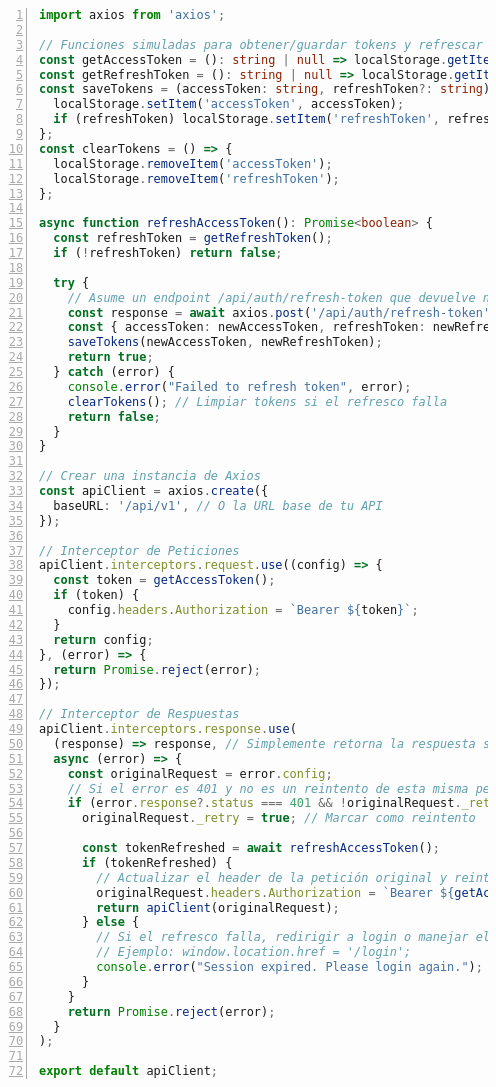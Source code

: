 \begin{lstlisting}[language=typescript,
  caption={Configuración de un interceptor de Axios para la gestión de tokens JWT.},
  label={lst:apx_axiosInterceptor_content},
  basicstyle=\footnotesize\ttfamily,
  breaklines=true,
  frame=tb,
  numbers=left,
  numberstyle=\tiny\color{gray}
]
import axios from 'axios';

// Funciones simuladas para obtener/guardar tokens y refrescar
const getAccessToken = (): string | null => localStorage.getItem('accessToken');
const getRefreshToken = (): string | null => localStorage.getItem('refreshToken');
const saveTokens = (accessToken: string, refreshToken?: string) => {
  localStorage.setItem('accessToken', accessToken);
  if (refreshToken) localStorage.setItem('refreshToken', refreshToken);
};
const clearTokens = () => {
  localStorage.removeItem('accessToken');
  localStorage.removeItem('refreshToken');
};

async function refreshAccessToken(): Promise<boolean> {
  const refreshToken = getRefreshToken();
  if (!refreshToken) return false;

  try {
    // Asume un endpoint /api/auth/refresh-token que devuelve nuevos tokens
    const response = await axios.post('/api/auth/refresh-token', { refreshToken });
    const { accessToken: newAccessToken, refreshToken: newRefreshToken } = response.data;
    saveTokens(newAccessToken, newRefreshToken);
    return true;
  } catch (error) {
    console.error("Failed to refresh token", error);
    clearTokens(); // Limpiar tokens si el refresco falla
    return false;
  }
}

// Crear una instancia de Axios
const apiClient = axios.create({
  baseURL: '/api/v1', // O la URL base de tu API
});

// Interceptor de Peticiones
apiClient.interceptors.request.use((config) => {
  const token = getAccessToken();
  if (token) {
    config.headers.Authorization = `Bearer ${token}`;
  }
  return config;
}, (error) => {
  return Promise.reject(error);
});

// Interceptor de Respuestas
apiClient.interceptors.response.use(
  (response) => response, // Simplemente retorna la respuesta si es exitosa
  async (error) => {
    const originalRequest = error.config;
    // Si el error es 401 y no es un reintento de esta misma petición
    if (error.response?.status === 401 && !originalRequest._retry) {
      originalRequest._retry = true; // Marcar como reintento
      
      const tokenRefreshed = await refreshAccessToken();
      if (tokenRefreshed) {
        // Actualizar el header de la petición original y reintentarla
        originalRequest.headers.Authorization = `Bearer ${getAccessToken()}`;
        return apiClient(originalRequest);
      } else {
        // Si el refresco falla, redirigir a login o manejar el error
        // Ejemplo: window.location.href = '/login';
        console.error("Session expired. Please login again.");
      }
    }
    return Promise.reject(error);
  }
);

export default apiClient;
\end{lstlisting}

